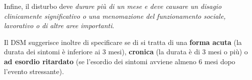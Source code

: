 \documentclass[]{article}
\begin{document}
Infine, il disturbo deve \emph{durare più di un mese e deve causare un
disagio clinicamente significativo o una menomazione del funzionamento
sociale, lavorativo o di altre aree importanti}.

Il DSM suggerisce inoltre di specificare se di si tratta di una
\textbf{forma acuta} (la durata dei sintomi è inferiore ai 3 mesi),
\textbf{cronica} (la durata è di 3 mesi o più) o \textbf{ad esordio
ritardato} (se l'esordio dei sintomi avviene almeno 6 mesi dopo l'evento
stressante).
\end{document}
